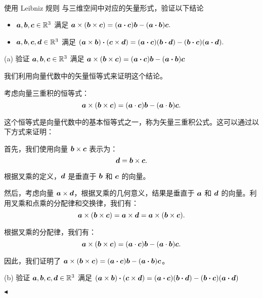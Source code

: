 \documentclass[11pt]{article}
\newenvironment{question}[2][Question]{\begin{trivlist}
\item[\hskip \labelsep {\bfseries #1}\hskip \labelsep {\bfseries #2.}]}{\hfill$\blacktriangleleft$\end{trivlist}}
\newcommand{\RR}{\mathbb{R}}
\begin{document}
    
    \begin{question}{4 (9') (内积)}~\\
    使用 Leibniz 规则 与三维空间中对应的矢量形式，验证以下结论
    \begin{itemize}
        \item [a (4')] $\vb*{a}, \vb*{b}, \vb*{c} \in \RR^3$ 满足 $\vb*{a}\times(\vb*{b} \times \vb*{c}) = (\vb*{a} \vdot \vb*{c})\vb*{b} - (\vb*{a} \vdot \vb*{b})\vb*{c}.$
        \item [b (5')] $\vb*{a}, \vb*{b}, \vb*{c}, \vb*{d} \in \RR^3$ 满足 $(\vb*{a} \times \vb*{b})\vdot(\vb*{c} \times \vb*{d}) = (\vb*{a} \vdot \vb*{c})(\vb*{b} \vdot \vb*{d}) - (\vb*{b} \vdot \vb*{c})(\vb*{a} \vdot \vb*{d}).$
    \end{itemize}

     (a) 验证 \(\vb*{a}, \vb*{b}, \vb*{c} \in \RR^3\) 满足 \(\vb*{a} \times (\vb*{b} \times \vb*{c}) = (\vb*{a} \vdot \vb*{c}) \vb*{b} - (\vb*{a} \vdot \vb*{b}) \vb*{c}\)
    
    我们利用向量代数中的矢量恒等式来证明这个结论。
    
    考虑向量三重积的恒等式：
    \[
    \vb*{a} \times (\vb*{b} \times \vb*{c}) = (\vb*{a} \cdot \vb*{c}) \vb*{b} - (\vb*{a} \cdot \vb*{b}) \vb*{c}.
    \]
    
    这个恒等式是向量代数中的基本恒等式之一，称为矢量三重积公式。这可以通过以下方式来证明：
    
    首先，我们使用向量 \(\vb*{b} \times \vb*{c}\) 表示为：
    \[
    \vb*{d} = \vb*{b} \times \vb*{c}.
    \]
    
    根据叉乘的定义，\(\vb*{d}\) 是垂直于 \(\vb*{b}\) 和 \(\vb*{c}\) 的向量。
    
    然后，考虑向量 \(\vb*{a} \times \vb*{d}\)，根据叉乘的几何意义，结果是垂直于 \(\vb*{a}\) 和 \(\vb*{d}\) 的向量。利用叉乘和点乘的分配律和交换律，我们有：
    \[
    \vb*{a} \times (\vb*{b} \times \vb*{c}) = \vb*{a} \times \vb*{d} = \vb*{a} \times (\vb*{b} \times \vb*{c}).
    \]
    
    根据叉乘的分配律，我们有：
    \[
    \vb*{a} \times (\vb*{b} \times \vb*{c}) = (\vb*{a} \cdot \vb*{c}) \vb*{b} - (\vb*{a} \cdot \vb*{b}) \vb*{c}.
    \]
    
    因此，我们证明了 \(\vb*{a} \times (\vb*{b} \times \vb*{c}) = (\vb*{a} \vdot \vb*{c}) \vb*{b} - (\vb*{a} \vdot \vb*{b}) \vb*{c}\)。
    
     (b) 验证 \(\vb*{a}, \vb*{b}, \vb*{c}, \vb*{d} \in \RR^3\) 满足 \((\vb*{a} \times \vb*{b}) \vdot (\vb*{c} \times \vb*{d}) = (\vb*{a} \vdot \vb*{c}) (\vb*{b} \vdot \vb*{d}) - (\vb*{b} \vdot \vb*{c}) (\vb*{a} \vdot \vb*{d})\)
    

\end{question}
\end{document}
